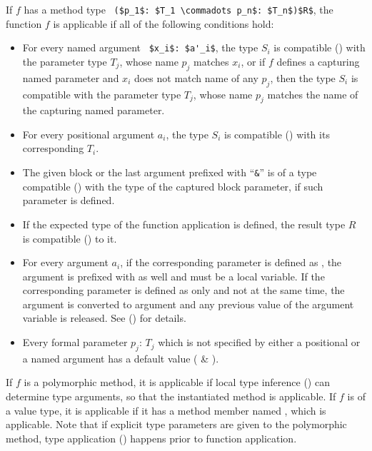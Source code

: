 If $f$ has a method type ~\lstinline!($p_1$: $T_1 \commadots p_n$: $T_n$)$R$!, the function $f$ is applicable if all of the following conditions hold:
\begin{itemize}

\item For every named argument ~\lstinline!$x_i$: $a'_i$!, the type $S_i$ is compatible () with the parameter type $T_j$, whose name $p_j$ matches $x_i$, or if $f$ defines a capturing named parameter and $x_i$ does not match name of any $p_j$, then the type $S_i$ is compatible with the parameter type $T_j$, whose name $p_j$ matches the name of the capturing named parameter.

\item For every positional argument $a_i$, the type $S_i$ is compatible () with its corresponding $T_i$. 

\item The given block or the last argument prefixed with ``\lstinline!&!'' is of a type compatible () with the type of the captured block parameter, if such parameter is defined. 

\item If the expected type of the function application is defined, the result type $R$ is compatible () to it. 

\item For every argument $a_i$, if the corresponding parameter is defined as , the argument is prefixed with  as well and must be a local variable. If the corresponding parameter is defined as only  and not  at the same time, the argument is converted to  argument and any previous value of the argument variable is released. See () for details. 

\item Every formal parameter $p_j$: $T_j$ which is not specified by either a positional or a named argument has a default value ( \& ). 
\end{itemize}

If $f$ is a polymorphic method, it is applicable if local type inference () can determine type arguments, so that the instantiated method is applicable. If $f$ is of a value type, it is applicable if it has a method member named , which is applicable. Note that if explicit type parameters are given to the polymorphic method, type application () happens prior to function application. 


